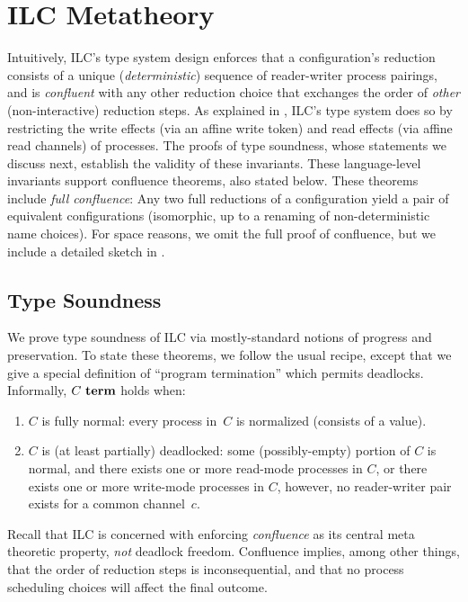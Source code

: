 \section{ILC Metatheory}
\label{sec:metatheory}


Intuitively, ILC's type system design enforces that a
configuration's reduction consists of a unique
(\emph{deterministic}) sequence of reader-writer process pairings,
and is \emph{confluent} with any other reduction choice that exchanges 
the order of \emph{other} (non-interactive) reduction steps.
%
As explained in , ILC's type system does so by restricting the
write effects (via an affine write token) and read effects (via affine read
channels) of processes.
%
The proofs of type soundness, whose statements we discuss next, 
establish the validity of these invariants.
%
These language-level invariants support confluence theorems, also
stated below.
%
These theorems include \emph{full confluence}:
Any two full reductions of a configuration yield a pair of equivalent configurations
(isomorphic, up to a renaming of non-deterministic name choices).
%
For space reasons, we omit the full proof of confluence, but we include a detailed sketch in .

\subsection{Type Soundness}

We prove type soundness of ILC via mostly-standard notions of progress
and preservation.
%
To state these theorems, we follow the usual recipe, except that we
give a special definition of ``program termination'' which permits
deadlocks.
%
Informally, $C~\textbf{term}$ holds when:
\begin{enumerate}
 \item $C$ is fully normal: every process in~$C$  
   is normalized (consists of a value).
 \item $C$ is (at least partially) deadlocked: 
   some (possibly-empty) portion of $C$ is normal, and
   there exists one or more read-mode processes in $C$, or
   there exists one or more write-mode processes in $C$,
   however, no reader-writer pair exists for a common channel~$c$.
\end{enumerate}

Recall that ILC is concerned with enforcing \emph{confluence} as its
central meta theoretic property, \emph{not} deadlock freedom.
%
Confluence implies, among other things, that the order of reduction steps is
inconsequential, and that no process scheduling choices will affect
the final outcome.
%

